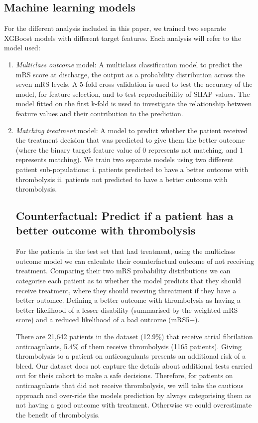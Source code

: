 \subsection{Machine learning models}
For the different analysis included in this paper, we trained two separate XGBoost models with different target features. Each analysis will refer to the model used:
\begin{enumerate}
    \item \textit{Multiclass outcome} model: A multiclass classification model to predict the mRS score at discharge, the output as a probability distribution across the seven mRS levels. A 5-fold cross validation is used to test the accuracy of the model, for feature selection, and to test reproducibility of SHAP values. The model fitted on the first k-fold is used to investigate the relationship between feature values and their contribution to the prediction.
    
    \item \textit{Matching treatment} model: A model to predict whether the patient received the treatment decision that was predicted to give them the better outcome (where the binary target feature value of 0 represents not matching, and 1 represents matching). We train two separate models using two different patient sub-populations: i. patients predicted to have a better outcome with thrombolysis ii. patients not predicted to have a better outcome with thrombolysis. 

\subsection{Counterfactual: Predict if a patient has a better outcome with thrombolysis}
For the patients in the test set that had treatment, using the {multiclass outcome} model we can calculate their counterfactual outcome of not receiving treatment. Comparing their two mRS probability distributions we can categorise each patient as to whether the model predicts that they should receive treatment, where they should receving threatment if they have a better outomce. Defining a better outcome with thrombolysis as having a better likelihood of a lesser disability (summarised by the weighted mRS score) and a reduced likelihood of a bad outcome (mRS5+).

There are 21,642 patients in the dataset (12.9\%) that receive atrial fibrilation anticoagulants, 5.4\% of them receive thrombolysis (1165 patients). Giving thrombolysis to a patient on anticoagulants presents an additional risk of a bleed. Our dataset does not capture the details about additional tests carried out for theis cohort to make a safe decisions. Therefore, for patients on anticoagulants that did not receive thrombolysis, we will take the cautious approach and over-ride the models prediction by always categorising them as not having a good outcome with treatment. Otherwise we could overestimate the benefit of thrombolysis.



\end{enumerate}

